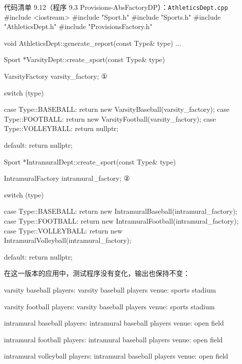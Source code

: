 \begin{codeboxt}{代码清单 9.12（程序 9.3 Provisions-AbsFactoryDP）：\texttt{Athletics\allowbreak{}Dept.\allowbreak{}cpp}}
#include <iostream>
#include "Sport.h"
#include "Sports.h"
#include "AthleticsDept.h"
#include "ProvisionsFactory.h"

void AthleticsDept::generate_report(const Type& type) ...

Sport *VarsityDept::create_sport(const Type& type)
{
    VarsityFactory varsity_factory;              ①

    switch (type)
    {
        case Type::BASEBALL:
            return new VarsityBaseball(varsity_factory);
        case Type::FOOTBALL:
            return new VarsityFootball(varsity_factory);
        case Type::VOLLEYBALL:
            return nullptr;

        default: return nullptr;
    }
}

Sport *IntramuralDept::create_sport(const Type& type)
{
    IntramuralFactory intramural_factory;        ②

    switch (type)
    {
        case Type::BASEBALL:
            return new IntramuralBaseball(intramural_factory);
        case Type::FOOTBALL:
            return new IntramuralFootball(intramural_factory);
        case Type::VOLLEYBALL:
            return new IntramuralVolleyball(intramural_factory);

        default: return nullptr;
    }
}
\end{codeboxt}
\par
{}\par

在这一版本的应用中，测试程序没有变化，输出也保持不变：

\begin{codebox}
varsity baseball
  players: varsity baseball players
    venue: sports stadium

varsity football
  players: varsity baseball players
    venue: sports stadium

intramural baseball
  players: intramural baseball players
    venue: open field

intramural football
  players: intramural baseball players
    venue: open field

intramural volleyball
  players: intramural baseball players
    venue: open field
\end{codebox}


